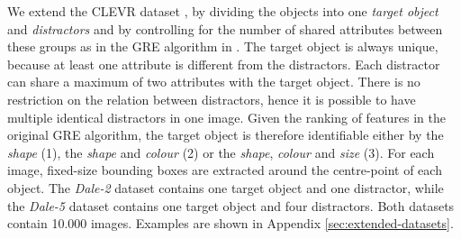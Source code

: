 \documentclass[11pt]{article}
\begin{document}
We extend the CLEVR dataset \citep{Johnson2016}, by dividing the objects into one \emph{target object} and \emph{distractors}
and by controlling for the number of shared attributes between these groups as %
in the GRE algorithm in \citep{Dale1995}.
The target object is always unique, because at least one attribute is different from the distractors.
Each distractor can share a maximum of two attributes with the target object.
There is no restriction on the relation between distractors, hence it is possible to have multiple identical distractors in one image.
Given the ranking of features in the original GRE algorithm, the target object is therefore identifiable either by the \emph{shape} (1), the \emph{shape} and \emph{colour} (2) or the \emph{shape}, \emph{colour} and \emph{size} (3).
For each image, fixed-size bounding boxes are extracted around the centre-point of each object.
%
The \emph{Dale-2} dataset contains one target object and one distractor, while the \emph{Dale-5} dataset contains one target object and four distractors.
Both datasets contain 10.000 images.
Examples are shown in
Appendix \ref{sec:extended-datasets}. %

\end{document}
